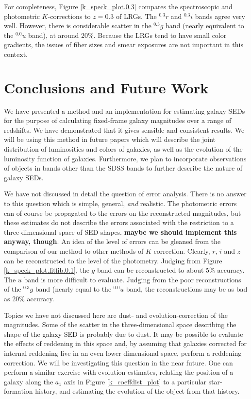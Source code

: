 \documentclass[10pt,preprint]{aastex}
\newcommand{\band}[2]{\ensuremath{^{#1}{#2}}}
\begin{document}
For completeness, Figure \ref{k_speck_plot.0.3} compares the
spectroscopic and photometric $K$-corrections to $z=0.3$ of LRGs. The
\band{0.3}{r} and \band{0.3}{i} bands agree very well. However, there
is considerable scatter in the \band{0.3}{g} band (nearly equivalent
to the \band{0.0}{u} band), at around 20\%. Because the LRGs tend to
have small color gradients, the issues of fiber sizes and smear
exposures are not important in this context.

\section{Conclusions and Future Work}
\label{conclusions}

We have presented a method and an implementation for estimating galaxy
SEDs for the purpose of calculating fixed-frame galaxy magnitudes over
a range of redshifts. We have demonstrated that it gives sensible and
consistent results. We will be using this method in future papers
which will describe the joint distribution of luminosities and colors
of galaxies, as well as the evolution of the luminosity function of
galaxies. Furthermore, we plan to incorporate observations of objects
in bands other than the SDSS bands to further describe the nature of
galaxy SEDs.

We have not discussed in detail the question of error analysis. There
is no answer to this question which is simple, general, {\it and}
realistic. The photometric errors can of course be propagated to the
errors on the reconstructed magnitudes, but these estimates do not
describe the errors associated with the restriction to a
three-dimensional space of SED shapes. {\bf maybe we should implement
this anyway, though}. An idea of the level of errors can be gleaned
from the comparison of our method to other methods of
$K$-correction. Clearly, $r$, $i$ and $z$ can be reconstructed to the
level of the photometry. Judging from Figure
\ref{k_speck_plot.fitfib.0.1}, the $g$ band can be reconstructed to
about 5\% accuracy. The $u$ band is more difficult to evaluate.
Judging from the poor reconstructions of the $\band{0.3}{g}$ band
(nearly equal to the $\band{0.0}{u}$ band, the reconstructions may be
as bad as 20\% accuracy.

Topics we have not discussed here are dust- and evolution-correction
of the magnitudes. Some of the scatter in the three-dimensional space
describing the shape of the galaxy SED is probably due to dust. It may
be possible to evaluate the effects of reddening in this space and, by
assuming that galaxies corrected for internal reddening live in an
even lower dimensional space, perform a reddening correction. We will
be investigating this question in the near future. One can perform a
similar exercise with evolution estimates, relating the position of a
galaxy along the $a_1$ axis in Figure \ref{k_coeffdist_plot} to a
particular star-formation history, and estimating the evolution of the
object from that history.
\end{document}
